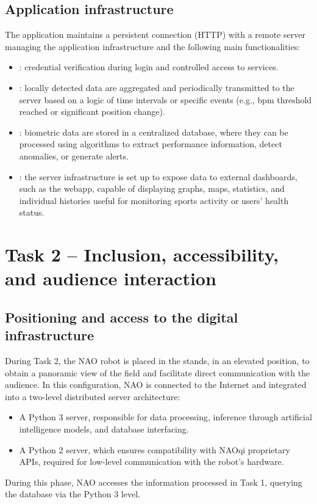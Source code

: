 \documentclass{optica-article}
\begin{document}
\subsection{Application infrastructure}
The application maintains a persistent connection (HTTP) with a remote server managing the application infrastructure and the following main functionalities:
\begin{itemize}
    \item {}: credential verification during login and controlled access to services.
    \item {}: locally detected data are aggregated and periodically transmitted to the server based on a logic of time intervals or specific events (e.g., bpm threshold reached or significant position change).
    \item {}: biometric data are stored in a centralized database, where they can be processed using algorithms to extract performance information, detect anomalies, or generate alerts.
    \item {}: the server infrastructure is set up to expose data to external dashboards, such as the webapp, capable of displaying graphs, maps, statistics, and individual histories useful for monitoring sports activity or users’ health status.
\end{itemize}
\bigskip

\section{Task 2 -- Inclusion, accessibility, and audience interaction}

\subsection{Positioning and access to the digital infrastructure}
During Task 2, the NAO robot is placed in the stands, in an elevated position, to obtain a panoramic view of the field and facilitate direct communication with the audience. In this configuration, NAO is connected to the Internet and integrated into a two-level distributed server architecture:
\begin{itemize}
    \item A Python 3 server, responsible for data processing, inference through artificial intelligence models, and database interfacing.
    \item A Python 2 server, which ensures compatibility with NAOqi proprietary APIs, required for low-level communication with the robot's hardware.
\end{itemize}
During this phase, NAO accesses the information processed in Task 1, querying the database via the Python 3 level.
\end{document}

